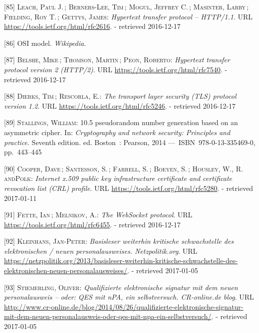 \documentclass[12pt,english,a4paper,titlepage,cleardoublepage=empty,dottedtoc]{report}
\begin{document}
\hypertarget{ref-web_spec_http1}{}
{[}85{]} \textsc{Leach, Paul J.}\,; \textsc{Berners-Lee, Tim}\,;
\textsc{Mogul, Jeffrey C.}\,; \textsc{Masinter, Larry}\,;
\textsc{Fielding, Roy T.}\,; \textsc{Gettys, James}: \emph{Hypertext
transfer protocol -- HTTP/1.1}. URL
\url{https://tools.ietf.org/html/rfc2616}. - retrieved 2016-12-17

\hypertarget{ref-web_2017_wikipedia_osi-model}{}
{[}86{]} OSI model. \emph{Wikipedia}.

\hypertarget{ref-web_spec_http2}{}
{[}87{]} \textsc{Belshe, Mike}\,; \textsc{Thomson, Martin}\,;
\textsc{Peon, Roberto}: \emph{Hypertext transfer protocol version 2
(HTTP/2)}. URL \url{https://tools.ietf.org/html/rfc7540}. - retrieved
2016-12-17

\hypertarget{ref-web_spec_tls}{}
{[}88{]} \textsc{Dierks, Tim}\,; \textsc{Rescorla, E.}: \emph{The
transport layer security (TLS) protocol version 1.2}. URL
\url{https://tools.ietf.org/html/rfc5246}. - retrieved 2016-12-17

\hypertarget{ref-book_2014_chapter-14-5-pki}{}
{[}89{]} \textsc{Stallings, William}: 10.5 pseudorandom number
generation based on an asymmetric cipher. In: \emph{Cryptography and
network security: Principles and practice}. Seventh edition. ed.
Boston~: Pearson, 2014 ---~ISBN~978-0-13-335469-0, pp.~443--445

\hypertarget{ref-web_spec_x509}{}
{[}90{]} \textsc{Cooper, Dave}\,; \textsc{Santesson, S.}\,;
\textsc{Farrell, S.}\,; \textsc{Boeyen, S.}\,; \textsc{Housley, W.,
\textnormal{R. andPolk}}: \emph{Internet x.509 public key infrastructure
certificate and certificate revocation list (CRL) profile}. URL
\url{https://tools.ietf.org/html/rfc5280}. - retrieved 2017-01-11

\hypertarget{ref-web_spec_websockets}{}
{[}91{]} \textsc{Fette, Ian}\,; \textsc{Melnikov, A.}: \emph{The
WebSocket protocol}. URL \url{https://tools.ietf.org/html/rfc6455}. -
retrieved 2016-12-17

\hypertarget{ref-web_2013_npa-sicherheitsdefizit}{}
{[}92{]} \textsc{Kleinhans, Jan-Peter}: \emph{Basisleser weiterhin
kritische schwachstelle des elektronischen / neuen personalausweises.
Netzpolitik.org}. URL
\url{https://netzpolitik.org/2013/basisleser-weiterhin-kritische-schwachstelle-des-elektronischen-neuen-personalausweises/}.
- retrieved 2017-01-05

\hypertarget{ref-web_2014_test-qes-support-in-npa}{}
{[}93{]} \textsc{Stiemerling, Oliver}: \emph{Qualifizierte elektronische
signatur mit dem neuen personalausweis -- oder: QES mit nPA, ein
selbstversuch. CR-online.de blog}. URL
\url{http://www.cr-online.de/blog/2014/08/26/qualifizierte-elektronische-signatur-mit-dem-neuen-personalausweis-oder-qes-mit-npa-ein-selbstversuch/}.
- retrieved 2017-01-05
\end{document}
